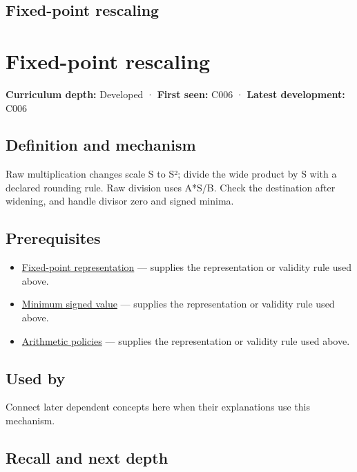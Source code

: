 \hypertarget{appendix-3333db47830f}{}
\section*{Fixed-point rescaling}
\chapter{Fixed-point rescaling}\label{appendix-3333db47830f-fixed-point-rescaling}

\textbf{Curriculum depth:} Developed · \textbf{First seen:} C006 · \textbf{Latest development:} C006

\section{Definition and mechanism}\label{appendix-3333db47830f-definition-and-mechanism}

Raw multiplication changes scale S to S²; divide the wide product by S with a declared rounding rule. Raw division uses A*S/B. Check the destination after widening, and handle divisor zero and signed minima.

\section{Prerequisites}\label{appendix-3333db47830f-prerequisites}

\begin{itemize}
\tightlist
\item
  \hyperref[appendix-1d0dbe8924cc]{Fixed-point representation} --- supplies the representation or validity rule used above.
\item
  \hyperref[appendix-05f39b10364d]{Minimum signed value} --- supplies the representation or validity rule used above.
\item
  \hyperref[appendix-2ed044358b82]{Arithmetic policies} --- supplies the representation or validity rule used above.
\end{itemize}

\section{Used by}\label{appendix-3333db47830f-used-by}

Connect later dependent concepts here when their explanations use this mechanism.

\section{Recall and next depth}\label{appendix-3333db47830f-recall-and-next-depth}

